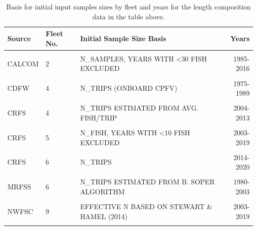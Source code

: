 \documentclass[11pt,
  english,
]{article}
\begin{document}
\begin{table}

\caption{\label{tab:length-inputN}Basis for initial input samples sizes by fleet and years for the length composition data in the table above.}
\centering
\fontsize{10}{12}\selectfont
\begin{tabular}[t]{lllr}
\toprule
Source & Fleet No. & Initial Sample Size Basis & Years\\
\midrule
\cellcolor{gray!6}{CALCOM} & \cellcolor{gray!6}{1} & \cellcolor{gray!6}{N\_SAMPLES, YEARS WITH <30 FISH EXCLUDED} & \cellcolor{gray!6}{1983-2020}\\
CALCOM & 2 & N\_SAMPLES, YEARS WITH <30 FISH EXCLUDED & 1985-2016\\
\cellcolor{gray!6}{CALCOM} & \cellcolor{gray!6}{3} & \cellcolor{gray!6}{N\_SAMPLES, YEARS WITH <30 FISH EXCLUDED} & \cellcolor{gray!6}{1983-1998}\\
CDFW & 4 & N\_TRIPS (ONBOARD CPFV) & 1975-1989\\
\cellcolor{gray!6}{CRFS} & \cellcolor{gray!6}{4} & \cellcolor{gray!6}{N\_TRIPS} & \cellcolor{gray!6}{2014-2020}\\
CRFS & 4 & N\_TRIPS ESTIMATED FROM AVG. FISH/TRIP & 2004-2013\\
\cellcolor{gray!6}{MRFSS} & \cellcolor{gray!6}{4} & \cellcolor{gray!6}{N\_TRIPS ESTIMATED FROM B. SOPER ALGORITHM} & \cellcolor{gray!6}{1980-2003}\\
CRFS & 5 & N\_FISH, YEARS WITH <10 FISH EXCLUDED & 2003-2019\\
\cellcolor{gray!6}{CDFW} & \cellcolor{gray!6}{6} & \cellcolor{gray!6}{N\_FISH / 10} & \cellcolor{gray!6}{1978-1978}\\
CRFS & 6 & N\_TRIPS & 2014-2020\\
\cellcolor{gray!6}{CRFS} & \cellcolor{gray!6}{6} & \cellcolor{gray!6}{N\_TRIPS ESTIMATED FROM AVG. FISH/TRIP} & \cellcolor{gray!6}{2004-2013}\\
MRFSS & 6 & N\_TRIPS ESTIMATED FROM B. SOPER ALGORITHM & 1980-2003\\
\cellcolor{gray!6}{NWFSC} & \cellcolor{gray!6}{8} & \cellcolor{gray!6}{N\_SAMPLES (NUMBER OF POSITIVE DROPS)} & \cellcolor{gray!6}{2004-2019}\\
NWFSC & 9 & EFFECTIVE N  BASED ON STEWART \& HAMEL (2014) & 2003-2019\\
\cellcolor{gray!6}{CDFW} & \cellcolor{gray!6}{11} & \cellcolor{gray!6}{N\_FISH / 10} & \cellcolor{gray!6}{1975-1979}\\
\bottomrule
\end{tabular}
\end{table}
\end{document}
